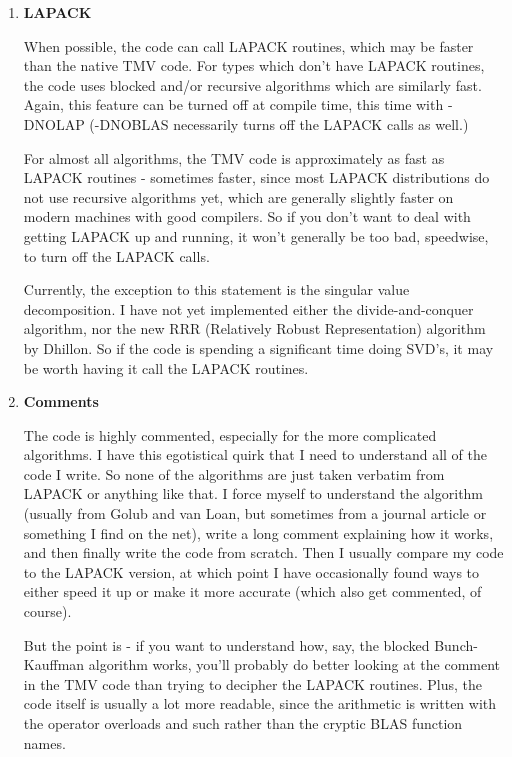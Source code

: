\documentclass[twoside,letterpaper,11pt]{article}
\begin{document}
\begin{enumerate}
\item
\textbf{LAPACK}

When possible, the code can call LAPACK routines, which
may be faster than the native TMV code.  For types which don't have LAPACK routines, 
the code uses blocked and/or recursive algorithms which are similarly fast.  
Again, this feature can be turned off at compile time, this time with -DNOLAP
(-DNOBLAS necessarily turns off the LAPACK calls as well.)

For almost all algorithms, 
the TMV code is approximately as fast as LAPACK routines -
sometimes faster, since most
LAPACK distributions do not use recursive algorithms yet, which are generally
slightly faster on modern machines with good compilers. 
So if you don't want to deal with getting LAPACK
up and running, it won't generally be too bad, speedwise, 
to turn off the LAPACK calls.

Currently, the exception to this statement
is the singular value decomposition.  I have not yet 
implemented either the divide-and-conquer algorithm, nor the new RRR
(Relatively Robust Representation) algorithm by Dhillon.  So if the code is
spending a significant time doing SVD's, it may be worth having it call the
LAPACK routines.

\item
\textbf{Comments}

The code is highly commented, especially for the more complicated algorithms.
I have this egotistical quirk that I need to understand all of the code I write.
So none of the algorithms are just taken verbatim from LAPACK or anything like that.
I force myself to understand the algorithm (usually from Golub and van Loan,
but sometimes from a journal article or something I find on the net),
write a long comment explaining how it works, and then finally write the code
from scratch.  Then I usually compare my code to the LAPACK version, at which point
I have occasionally found ways to either speed it up or make it more accurate
(which also get commented, of course).

But the point is - if you want to understand how, say, the blocked Bunch-Kauffman
algorithm works, you'll probably do better looking at the comment in the 
TMV code than trying to decipher the LAPACK routines.  Plus, the code itself is
usually a lot more readable, since the arithmetic is written with the operator
overloads and such rather than the cryptic BLAS function names.

\end{enumerate}
\end{document}
